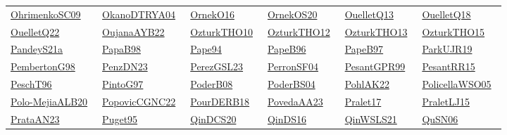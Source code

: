 \begin{longtable}{*{6}{l}}
\href{../works/OhrimenkoSC09.pdf}{OhrimenkoSC09}~\cite{OhrimenkoSC09} & \href{../}{OkanoDTRYA04}~\cite{OkanoDTRYA04} & \href{../works/OrnekO16.pdf}{OrnekO16}~\cite{OrnekO16} & \href{../works/OrnekOS20.pdf}{OrnekOS20}~\cite{OrnekOS20} & \href{../works/OuelletQ13.pdf}{OuelletQ13}~\cite{OuelletQ13} & \href{../works/OuelletQ18.pdf}{OuelletQ18}~\cite{OuelletQ18}\\ 
\href{../works/OuelletQ22.pdf}{OuelletQ22}~\cite{OuelletQ22} & \href{../works/OujanaAYB22.pdf}{OujanaAYB22}~\cite{OujanaAYB22} & \href{../works/OzturkTHO10.pdf}{OzturkTHO10}~\cite{OzturkTHO10} & \href{../works/OzturkTHO12.pdf}{OzturkTHO12}~\cite{OzturkTHO12} & \href{../works/OzturkTHO13.pdf}{OzturkTHO13}~\cite{OzturkTHO13} & \href{../works/OzturkTHO15.pdf}{OzturkTHO15}~\cite{OzturkTHO15}\\ 
\href{../works/PandeyS21a.pdf}{PandeyS21a}~\cite{PandeyS21a} & \href{../works/PapaB98.pdf}{PapaB98}~\cite{PapaB98} & \href{../works/Pape94.pdf}{Pape94}~\cite{Pape94} & \href{../}{PapeB96}~\cite{PapeB96} & \href{../}{PapeB97}~\cite{PapeB97} & \href{../works/ParkUJR19.pdf}{ParkUJR19}~\cite{ParkUJR19}\\ 
\href{../works/PembertonG98.pdf}{PembertonG98}~\cite{PembertonG98} & \href{../works/PenzDN23.pdf}{PenzDN23}~\cite{PenzDN23} & \href{../works/PerezGSL23.pdf}{PerezGSL23}~\cite{PerezGSL23} & \href{../works/PerronSF04.pdf}{PerronSF04}~\cite{PerronSF04} & \href{../works/PesantGPR99.pdf}{PesantGPR99}~\cite{PesantGPR99} & \href{../works/PesantRR15.pdf}{PesantRR15}~\cite{PesantRR15}\\ 
\href{../}{PeschT96}~\cite{PeschT96} & \href{../}{PintoG97}~\cite{PintoG97} & \href{../works/PoderB08.pdf}{PoderB08}~\cite{PoderB08} & \href{../works/PoderBS04.pdf}{PoderBS04}~\cite{PoderBS04} & \href{../works/PohlAK22.pdf}{PohlAK22}~\cite{PohlAK22} & \href{../works/PolicellaWSO05.pdf}{PolicellaWSO05}~\cite{PolicellaWSO05}\\ 
\href{../works/Polo-MejiaALB20.pdf}{Polo-MejiaALB20}~\cite{Polo-MejiaALB20} & \href{../works/PopovicCGNC22.pdf}{PopovicCGNC22}~\cite{PopovicCGNC22} & \href{../works/PourDERB18.pdf}{PourDERB18}~\cite{PourDERB18} & \href{../works/PovedaAA23.pdf}{PovedaAA23}~\cite{PovedaAA23} & \href{../works/Pralet17.pdf}{Pralet17}~\cite{Pralet17} & \href{../works/PraletLJ15.pdf}{PraletLJ15}~\cite{PraletLJ15}\\ 
\href{../works/PrataAN23.pdf}{PrataAN23}~\cite{PrataAN23} & \href{../works/Puget95.pdf}{Puget95}~\cite{Puget95} & \href{../works/QinDCS20.pdf}{QinDCS20}~\cite{QinDCS20} & \href{../works/QinDS16.pdf}{QinDS16}~\cite{QinDS16} & \href{../works/QinWSLS21.pdf}{QinWSLS21}~\cite{QinWSLS21} & \href{../works/QuSN06.pdf}{QuSN06}~\cite{QuSN06}\\ 

\end{longtable}
